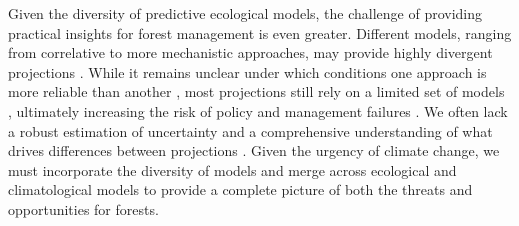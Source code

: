 \documentclass[11pt,letter]{article}
\begin{document}
Given the diversity of predictive ecological models, the challenge of providing practical insights for forest management is even greater. Different models, ranging from correlative to more mechanistic approaches, may provide highly divergent projections \citep{Morin2009, Keenan2011a, Cheaib2012, Takolander2019}. While it remains unclear under which conditions one approach is more reliable than another \citep{VanderMeersch2024}, most projections still rely on a limited set of models \citep{Dyderski2018, Wessely2024, Hanewinkel2013, Schueler2014}, ultimately increasing the risk of policy and management failures \citep{Dawson2011}. We often lack a robust estimation of uncertainty and a comprehensive understanding of what drives differences between projections \citep{Simmonds2024}. Given the urgency of climate change, we must incorporate the diversity of models and merge across ecological and climatological models to provide a complete picture of both the threats and opportunities for forests. 
\end{document}
